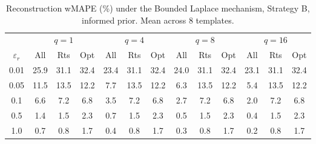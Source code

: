 \begin{table}[h]
\centering
\setlength{\tabcolsep}{2.5pt}
\small
\caption{Reconstruction wMAPE (\%) under the Bounded Laplace mechanism, Strategy B, informed prior. Mean across 8 templates.}
\label{tab:rq2_blap_agg}
\begin{tabular}{c|ccc|ccc|ccc|ccc}
\toprule
 & \multicolumn{3}{c|}{$q=1$} & \multicolumn{3}{c|}{$q=4$} & \multicolumn{3}{c|}{$q=8$} & \multicolumn{3}{c}{$q=16$} \\
$\varepsilon_r$ & All & Rts & Opt & All & Rts & Opt & All & Rts & Opt & All & Rts & Opt \\
\midrule
0.01 & 25.9 & 31.1 & 32.4 & 23.4 & 31.1 & 32.4 & 24.0 & 31.1 & 32.4 & 23.1 & 31.1 & 32.4 \\
0.05 & 11.5 & 13.5 & 12.2 & 7.7 & 13.5 & 12.2 & 6.3 & 13.5 & 12.2 & 5.4 & 13.5 & 12.2 \\
0.1 & 6.6 & 7.2 & 6.8 & 3.5 & 7.2 & 6.8 & 2.7 & 7.2 & 6.8 & 2.0 & 7.2 & 6.8 \\
0.5 & 1.4 & 1.5 & 2.3 & 0.7 & 1.5 & 2.3 & 0.5 & 1.5 & 2.3 & 0.4 & 1.5 & 2.3 \\
1.0 & 0.7 & 0.8 & 1.7 & 0.4 & 0.8 & 1.7 & 0.3 & 0.8 & 1.7 & 0.2 & 0.8 & 1.7 \\
\bottomrule
\end{tabular}
\end{table}
